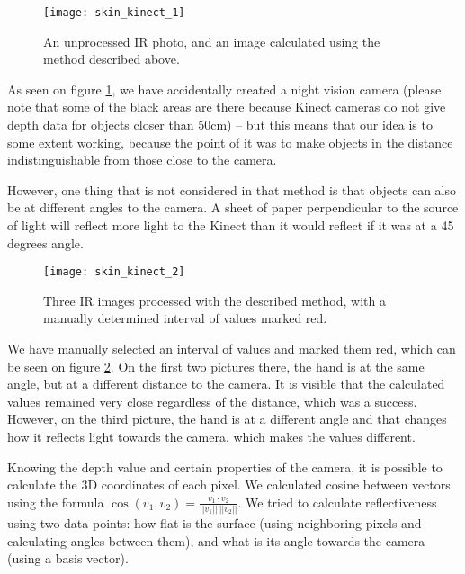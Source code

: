             \begin{figure}[H]
                \caption{An unprocessed IR photo, and an image calculated using
                the method described above.}
                \centering
                \texttt{[image: skin\_kinect\_1]}
                \label{fig:skin_kinect_1}
            \end{figure}

            As seen on figure \ref{fig:skin_kinect_1}, we have accidentally created
            a night vision camera (please note that some of the black areas are there
            because Kinect cameras do not give depth data for objects closer than 50cm)
            -- but this means that our idea is to some extent working, because the point
            of it was to make objects in the distance indistinguishable from those close
            to the camera.

            However, one thing that is not considered in that method is that objects
            can also be at different angles to the camera.
            A sheet of paper perpendicular to the source of light will reflect more
            light to the Kinect than it would reflect if it was at a 45 degrees angle.

            \begin{figure}[H]
                \caption{Three IR images processed with the described method, with a
                manually determined interval of values marked red.}
                \centering
                \texttt{[image: skin\_kinect\_2]}
                \label{fig:skin_kinect_2}
            \end{figure}

            We have manually selected an interval of values and marked them red, which
            can be seen on figure \ref{fig:skin_kinect_2}.
            On the first two pictures there, the hand is at the same angle, but at a
            different distance to the camera.
            It is visible that the calculated values remained very close regardless
            of the distance, which was a success.
            However, on the third picture, the hand is at a different angle and
            that changes how it reflects light towards the camera, which makes the values
            different.

            Knowing the depth value and certain properties of the camera, it is possible
            to calculate the 3D coordinates of each pixel.
            We calculated cosine between vectors using the formula
            $\cos(v_1, v_2) = \frac{v_1 \cdot v_2}{||v_1||~||v_2||}$.
            We tried to calculate reflectiveness using two data points:
            how flat is the surface (using neighboring pixels and calculating angles between them),
            and what is its angle towards the camera (using a basis vector).

